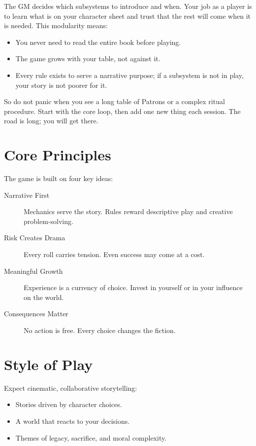 The GM decides which subsystems to introduce and when. Your job as a player is to learn what is on your character sheet and trust that the rest will come when it is needed. This modularity means:
\begin{itemize}
  \item You never need to read the entire book before playing.
  \item The game grows with your table, not against it.
  \item Every rule exists to serve a narrative purpose; if a subsystem is not in play, your story is not poorer for it.
\end{itemize}

So do not panic when you see a long table of Patrons or a complex ritual procedure. Start with the core loop, then add one new thing each session. The road is long; you will get there.

\section*{Core Principles}

The game is built on four key ideas:

\begin{description}
\item[Narrative First] Mechanics serve the story. Rules reward descriptive play and creative problem-solving.
\item[Risk Creates Drama] Every roll carries tension. Even success may come at a cost.
\item[Meaningful Growth] Experience is a currency of choice. Invest in yourself or in your influence on the world.
\item[Consequences Matter] No action is free. Every choice changes the fiction.
\end{description}

\section*{Style of Play}

Expect cinematic, collaborative storytelling:
\begin{itemize}
\item Stories driven by character choices.
\item A world that reacts to your decisions.
\item Themes of legacy, sacrifice, and moral complexity.
\end{itemize}

